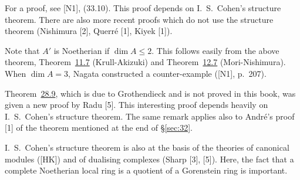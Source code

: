 For a proof, see [N1], (33.10). This proof depends on I.~S.~Cohen's structure
theorem. There are also more recent proofs which do not use the structure
theorem (Nishimura [2], Querr\'e [1], Kiyek [1]).

Note that $A'$ is Noetherian if $\dim A \le 2$. This follows easily from the above
theorem, Theorem~\hyperref[thm:11.7]{11.7} (Krull-Akizuki) and Theorem~\hyperref[thm:12.7]{12.7} (Mori-Nishimura).
When $\dim A = 3$, Nagata constructed a counter-example ([N1], p.~207).

Theorem~\hyperref[thm:28.9]{28.9}, which is due to Grothendieck and is not proved in this book,
was given a new proof by Radu [5]. This interesting proof depends heavily on
I.~S.~Cohen's structure theorem. The same remark applies also to Andr\'e's proof
[1] of the theorem mentioned at the end of \S\ref{sec:32}.

I.~S.~Cohen's structure theorem is also at the basis of the theories of canonical
modules ([HK]) and of dualising complexes (Sharp [3], [5]). Here, the fact that
a complete Noetherian local ring is a quotient of a Gorenstein ring is
important.
